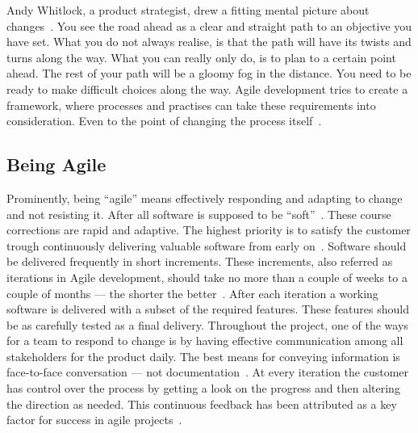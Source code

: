 \documentclass[english]{tktltiki2}
\begin{document}
Andy Whitlock, a product strategist, drew a fitting mental picture about changes~\cite{Whi14}. You see the road ahead as a clear and straight path to an objective you have set. What you do not always realise, is that the path will have its twists and turns along the way. What you can really only do, is to plan to a certain point ahead. The rest of your path will be a gloomy fog in the distance. You need to be ready to make difficult choices along the way. Agile development tries to create a framework, where processes and practises can take these requirements into consideration. Even to the point of changing the process itself~\cite{Fow05}.

\subsection{Being Agile}

Prominently, being “agile” means effectively responding and adapting to change and not resisting it. After all software is supposed to be “soft”~\cite{Fow05}. These course corrections are rapid and adaptive. The highest priority is to satisfy the customer trough continuously delivering valuable software from early on~\cite{BBB01b}. Software should be delivered frequently in short increments. These increments, also referred as iterations in Agile development, should take no more than a couple of weeks to a couple of months — the shorter the better~\cite{Fow05}. After each iteration a working software is delivered with a subset of the required features. These features should be as carefully tested as a final delivery. Throughout the project, one of the ways for a team to respond to change is by having effective communication among all stakeholders for the product daily. The best means for conveying information is face-to-face conversation — not documentation~\cite{BBB01b}. At every iteration the customer has control over the process by getting a look on the progress and then altering the direction as needed. This continuous feedback has been attributed as a key factor for success in agile projects~\cite{DD08}.
\end{document}

